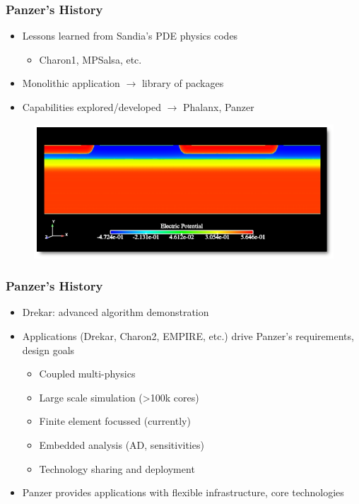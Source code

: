 \documentclass{beamer}
\begin{document}
  \begin{frame}
    \frametitle{Panzer's History}
    \begin{itemize}
      \item Lessons learned from Sandia's PDE physics codes
      \begin{itemize}
        \item Charon1, MPSalsa, etc.
      \end{itemize}
      \item Monolithic application $\longrightarrow$ library of packages
      \item Capabilities explored/developed $\longrightarrow$ Phalanx, Panzer
    \end{itemize}
    \begin{figure}
      \includegraphics[height=.4\textheight]{driftDiffusion}
    \end{figure}
  \end{frame}

  \begin{frame}
    \frametitle{Panzer's History}
    \begin{itemize}
      \item Drekar:  advanced algorithm demonstration
      \item Applications (Drekar, Charon2, EMPIRE, etc.) drive Panzer's requirements, design goals
      \begin{itemize}
        \item Coupled multi-physics
        \item Large scale simulation (>100k cores)
        \item Finite element focussed (currently)
        \item Embedded analysis (AD, sensitivities)
        \item Technology sharing and deployment
      \end{itemize}
      \item Panzer provides applications with flexible infrastructure, core technologies
    \end{itemize}
  \end{frame}
\end{document}
